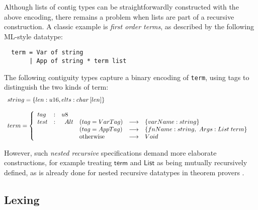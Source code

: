 \documentclass[a4paper,UKenglish,cleveref, autoref, thm-restate]{lipics-v2021}
\newcommand{\konst}[1]{\ensuremath{\mathsf{#1}}}
\begin{document}
\begin{example}

Although lists of contig types can be straightforwardly constructed
with the above encoding, there remains a problem when lists are part
of a recursive construction. A classic example is \emph{first order
  terms}, as described by the following ML-style datatype:

{\small
\begin{verbatim}
  term = Var of string
       | App of string * term list
\end{verbatim}}

\noindent The following contiguity types capture a binary encoding of
\verb+term+, using tags to distinguish the two kinds of term:
\[
\begin{array}{l}
  \konst{string} = \{\konst{len} : \konst{u16}, \konst{elts} : \konst{char}\, [\konst{len}] \}
\\ \\
 \konst{term} =
   \left\{
     \begin{array}{lcl}
       \konst{tag} & : & \konst{u8} \\
       \konst{test} & : &
       \begin{array}[t] {lcl}
         \konst{Alt} \quad (\konst{tag} = \konst{VarTag})
                      & \longrightarrow
                      & \{\konst{varName} : \konst{string}\} \\
\phantom{\konst{Alt}} \quad (\konst{tag} = \konst{AppTag})
                  & \longrightarrow &
          \{ \konst{fnName} : \konst{string}, \ \konst{Args} : \konst{List}\; \konst{term} \} \\
\phantom{\konst{Alt}} \quad \text{otherwise} & \longrightarrow & \konst{Void}
        \end{array}
     \end{array}
   \right.
\end{array}
\]

However, such \emph{nested recursive} specifications demand more
elaborate constructions, for example treating \konst{term} and
\konst{List} as being mutually recursively defined, as is already done
for nested recursive datatypes in theorem provers \cite{jrh:ind-defs}.
\end{example}

\subsection{Lexing}
\end{document}
